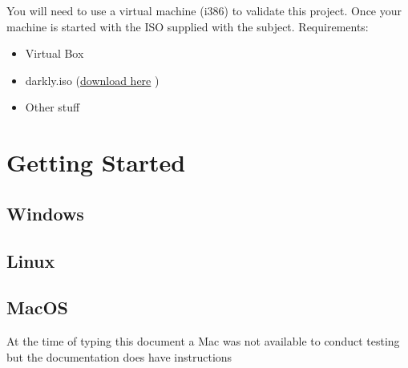 You will need to use a virtual machine (i386) to validate this project. Once your
machine is started with the ISO supplied with the subject.
Requirements:
\begin{itemize}
    \item Virtual Box
    \item darkly.iso (\href{https://drive.google.com/file/d/145dbZHjZWyMiRscj-72jE3n5PM5vXyB9/view?usp=sharing}{download here} )
    \item Other stuff
\end{itemize}

\section{Getting Started}

\subsection{Windows}

%




\subsection{Linux}



\subsection{MacOS}
At the time of typing this document a Mac was not available to conduct testing
but the documentation\cite{Docker:Mac_Install} does have instructions




